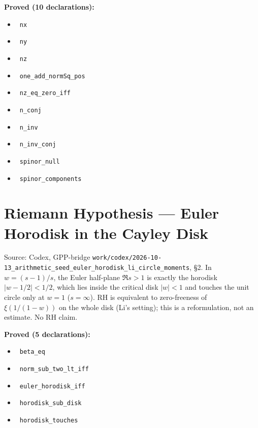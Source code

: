 \documentclass{report}
\theoremstyle{definition}
\begin{document}
\noindent\textbf{Proved (10 declarations):}
\begin{itemize}
  \item {}\leanok\ \texttt{nx}
  \item {}\leanok\ \texttt{ny}
  \item {}\leanok\ \texttt{nz}
  \item {}\leanok\ \texttt{one\_add\_normSq\_pos}
  \item {}\leanok\ \texttt{nz\_eq\_zero\_iff}
  \item {}\leanok\ \texttt{n\_conj}
  \item {}\leanok\ \texttt{n\_inv}
  \item {}\leanok\ \texttt{n\_inv\_conj}
  \item {}\leanok\ \texttt{spinor\_null}
  \item {}\leanok\ \texttt{spinor\_components}
\end{itemize}

\section{Riemann Hypothesis --- Euler Horodisk in the Cayley Disk}
Source: Codex, GPP-bridge \texttt{work/codex/2026-10-13\_arithmetic\_seed\_euler\_horodisk\_li\_circle\_moments}, \S2. In $w=(s-1)/s$, the Euler half-plane $\Re s>1$ is exactly the horodisk $|w-1/2|<1/2$, which lies inside the critical disk $|w|<1$ and touches the unit circle only at $w=1$ ($s=\infty$). RH is equivalent to zero-freeness of $\xi(1/(1-w))$ on the whole disk (Li's setting); this is a reformulation, not an estimate. No RH claim.

\noindent\textbf{Proved (5 declarations):}
\begin{itemize}
  \item {}\leanok\ \texttt{beta\_eq}
  \item {}\leanok\ \texttt{norm\_sub\_two\_lt\_iff}
  \item {}\leanok\ \texttt{euler\_horodisk\_iff}
  \item {}\leanok\ \texttt{horodisk\_sub\_disk}
  \item {}\leanok\ \texttt{horodisk\_touches}
\end{itemize}
\end{document}
